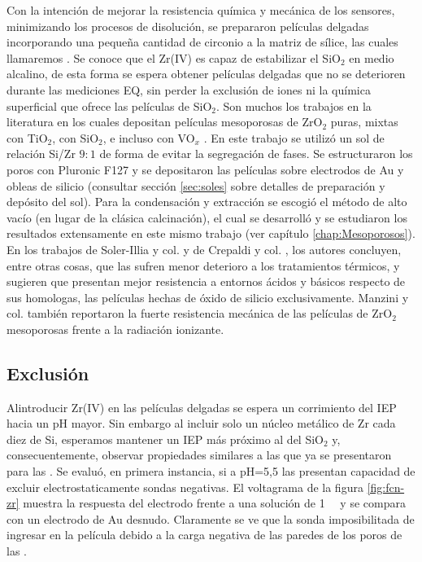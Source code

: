 			Con la intención de mejorar la resistencia química y mecánica de los sensores, minimizando los procesos de disolución, se prepararon películas delgadas incorporando una pequeña cantidad de circonio a la matriz de sílice, las cuales llamaremos \pdmZ. Se conoce que el Zr(IV) es capaz de estabilizar el SiO$_2$ en medio alcalino\cite{Soler-Illia2004}, de esta forma se espera obtener películas delgadas que no se deterioren durante las mediciones EQ, sin perder la exclusión de iones ni la química superficial que ofrece las películas de SiO$_2$. Son muchos los trabajos en la literatura en los cuales depositan películas mesoporosas de ZrO$_2$ puras, mixtas con TiO$_2$, con SiO$_2$, e incluso con VO$_x$ \cite{Andrini2016,Soler-Illia2004,Crepaldi2002a,Gimenez2016,Zelcer2013,Calvo20210,Angelome2008}. En este trabajo se utilizó un sol de relación Si/Zr $9\!:\!1$ de forma de evitar la segregación de fases\cite{Soler-Illia2004}. Se estructuraron los poros con Pluronic F127 y se depositaron las películas sobre electrodos de Au y obleas de silicio (consultar sección \ref{sec:soles} sobre detalles de preparación y depósito del sol). Para la condensación y extracción se escogió el método de alto vacío (en lugar de la clásica calcinación), el cual se desarrolló y se estudiaron los resultados extensamente en este mismo trabajo (ver capítulo \ref{chap:Mesoporosos}). En los trabajos de Soler-Illia y col.\cite{Soler-Illia2004} y de Crepaldi y col. \cite{Crepaldi2002a}, los autores concluyen, entre otras cosas, que las \pdmZ\space sufren menor deterioro a los tratamientos térmicos, y sugieren que presentan mejor resistencia a entornos ácidos y básicos respecto de sus homologas, las películas hechas de óxido de silicio exclusivamente. Manzini y col.\cite{Gimenez2016} también reportaron la fuerte resistencia mecánica de las películas de ZrO$_2$ mesoporosas frente a la radiación ionizante.

	 \subsection{Exclusión}

	 	 Al\space introducir Zr(IV) en las películas delgadas se espera un corrimiento del IEP hacia un pH mayor\cite{Kosmulski2014}. Sin embargo al incluir solo un núcleo metálico de Zr cada diez de Si, esperamos mantener un IEP más próximo al del SiO$_2$ y, consecuentemente, observar propiedades similares a las que ya se presentaron para las \pdmF.
	 	 Se evaluó, en primera instancia, si a pH=5,5 las \pdmZ\space presentan capacidad de excluir electrostaticamente sondas negativas. El voltagrama de la figura \ref{fig:fcn-zr} muestra la respuesta del electrodo frente a una solución de \fe\space \SI{1}{\milli\Molar} y se compara con un electrodo de Au desnudo. Claramente se ve que la sonda imposibilitada de ingresar en la película debido a la carga negativa de las paredes de los poros de las \pdmZ. 
				
